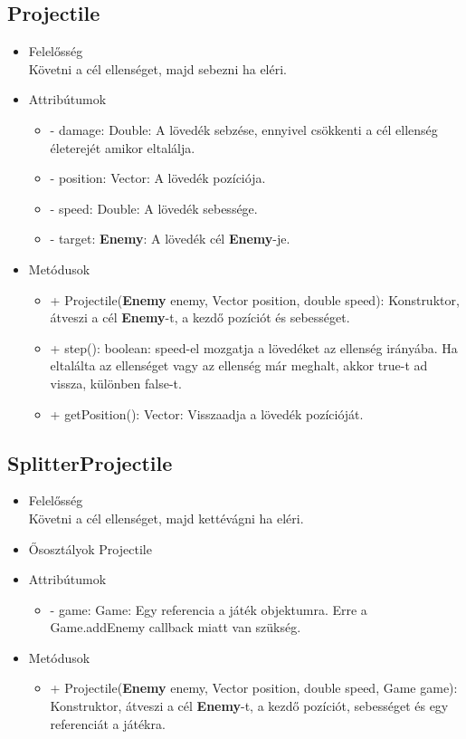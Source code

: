 \subsection{Projectile}
\begin{itemize}
\item Felelősség\\
Követni a cél ellenséget, majd sebezni ha eléri.
\item Attribútumok
	\begin{itemize}
		\item - damage: Double: A lövedék sebzése, ennyivel csökkenti a cél ellenség életerejét amikor eltalálja.
		\item - position: Vector: A lövedék pozíciója.
		\item - speed: Double: A lövedék sebessége.
		\item - target: \textbf{Enemy}: A lövedék cél \textbf{Enemy}-je.
	\end{itemize}
\item Metódusok
	\begin{itemize}
		\item + Projectile(\textbf{Enemy} enemy, Vector position, double speed): Konstruktor, átveszi a cél \textbf{Enemy}-t, a kezdő pozíciót és sebességet.
		\item + step(): boolean: speed-el mozgatja a lövedéket az ellenség irányába. Ha eltalálta az ellenséget vagy az ellenség már meghalt, akkor true-t ad vissza, különben false-t.
		\item + getPosition(): Vector: Visszaadja a lövedék pozícióját.
	\end{itemize}
\end{itemize}

\subsection{SplitterProjectile}
\begin{itemize}
\item Felelősség\\
Követni a cél ellenséget, majd kettévágni ha eléri.
\item Ősosztályok\newline
Projectile
\item Attribútumok
	\begin{itemize}
		\item - game: Game: Egy referencia a játék objektumra. Erre a Game.addEnemy callback miatt van szükség.
	\end{itemize}
\item Metódusok
	\begin{itemize}
		\item + Projectile(\textbf{Enemy} enemy, Vector position, double speed, Game game): Konstruktor, átveszi a cél \textbf{Enemy}-t, a kezdő pozíciót, sebességet és egy referenciát a játékra.
	\end{itemize}
\end{itemize}

